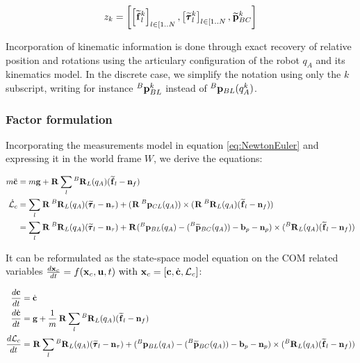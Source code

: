 \documentclass[11pt]{article}
\newcommand{\Rot}[2]{\prescript{#1}{}{\bfR}_{#2}}
\newcommand{\noise}{\bfn}
\newcommand{\bias}{\bfb}
\newcommand{\posi}[2]{\prescript{#1}{}{\bfp}_{#2}}
\newcommand{\posim}[2]{\prescript{#1}{}{\widetilde{\bfp}}_{#2}}
\newcommand{\forcem}[2]{\prescript{#1}{}{\widetilde{\bff}}_{#2}}
\newcommand{\torquem}[2]{\prescript{#1}{}{\widetilde{\pmb{\tau}}}_{#2}}
\newcommand{\AM}{\mathcal{L}}
\newcommand{\COM}{\bfc}
\newcommand{\COMd}{\dot{\bfc}}
\begin{document}
\begin{equation}
z_k = \left[ \left[\forcem{}{l}^k \right]_{l \in [1..N}, \left[\torquem{}{l}^k \right]_{l \in [1..N}, \posim{}{BC}^k \right]
\end{equation}
%

Incorporation of kinematic information is done through exact recovery of relative position and rotations using the articulary configuration of the robot $q_A$ and its kinematics model. In the discrete case, we simplify the notation using only the $k$ subscript, writing for instance $\posi{B}{BL}^k$ instead of $\posi{B}{BL}(q_A^k)$.

\subsubsection{Factor formulation}
Incorporating the measurements model in equation \ref{eq:NewtonEuler} and expressing it in the world frame \(W\), we derive the equations:

\begin{equation}
\begin{split}
m\ddot{\COM}&= 
m\bfg + \Rot{}{} \sum_l \Rot{B}{L}(q_A) (\forcem{}{l} - \noise_f) 
\\
\dot{\AM}_c&= 
\sum_l \Rot{}{}\Rot{B}{L}(q_A)(\torquem{}{l} - \noise_{\tau}) + (\Rot{}{} \posi{B}{CL}(q_A)) \times (\Rot{}{}\Rot{B}{L}(q_A)(\forcem{}{l} - \noise_f))
\\
&= \sum_l \Rot{}{}\Rot{B}{L}(q_A)(\torquem{}{l} - \noise_{\tau}) + \Rot{}{}( \posi{B}{BL}(q_A) - (\posim{B}{BC}(q_A)) -  \bias_{p} - \noise_p) \times (\Rot{B}{L}(q_A)(\forcem{}{l} - \noise_f))
\end{split}
\end{equation}

It can be reformulated as the state-space model equation on the COM related variables \( \frac{d\bfx_c}{dt}= f(\bfx_c, \bfu, t)$ with $\bfx_c = [\COM, \COMd, \AM_c]\):

\begin{equation}
\begin{split}
\frac{d\COM}{dt} &= \COMd 
\\
\frac{d\dot{\bfc}}{dt}&= \bfg + \frac{1}{m} \Rot{}{} \sum_l \Rot{B}{L}(q_A) (\forcem{}{l} - \noise_f) 
\\
\frac{d\AM_c}{dt}&= \Rot{}{} \sum_l \Rot{B}{L}(q_A)(\torquem{}{l} - \noise_{\tau}) + (\posi{B}{BL}(q_A) - (\posim{B}{BC}(q_A)) -  \bias_{p} - \noise_p) \times (\Rot{B}{L}(q_A)(\forcem{}{l} - \noise_f))
\end{split}
\label{eq:COMContinuous}
\end{equation}
\end{document}
